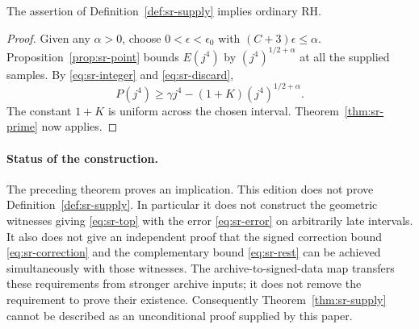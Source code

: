 \begin{srtheorem}\label{thm:sr-supply}
The assertion of Definition~\ref{def:sr-supply} implies ordinary RH.
\end{srtheorem}
\begin{proof}
Given any \(\alpha>0\), choose \(0<\epsilon<\epsilon_0\) with
\((C+3)\epsilon\leq\alpha\).
Proposition~\ref{prop:sr-point} bounds \(E(j^4)\) by
\((j^4)^{1/2+\alpha}\) at all the supplied samples.
By \eqref{eq:sr-integer} and \eqref{eq:sr-discard},
\[
 P(j^4)\geq\gamma j^4-(1+K)(j^4)^{1/2+\alpha}.
\]
The constant \(1+K\) is uniform across the chosen interval.
Theorem~\ref{thm:sr-prime} now applies.
\end{proof}

\paragraph{Status of the construction.}
The preceding theorem proves an implication. This edition does not prove
Definition~\ref{def:sr-supply}. In particular it does not construct
the geometric witnesses giving \eqref{eq:sr-top} with the error
\eqref{eq:sr-error} on arbitrarily late intervals. It also does not give
an independent proof that the signed correction bound
\eqref{eq:sr-correction} and the complementary bound
\eqref{eq:sr-rest} can be achieved simultaneously with those witnesses.
The archive-to-signed-data map transfers these requirements from stronger
archive inputs; it does not remove the requirement to prove their existence.
Consequently Theorem~\ref{thm:sr-supply} cannot be described as an
unconditional proof supplied by this paper.
